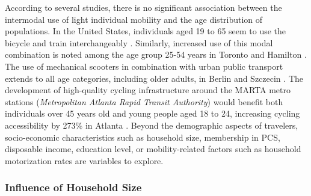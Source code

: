 \begin{refsegment}
According to several studies, there is no significant association between the intermodal use of light individual mobility and the age distribution of populations. In the United States, individuals aged 19 to 65 seem to use the bicycle and train interchangeably \textcolor{blue}{\autocite[108]{wang_bicycle-transit_2013}}. Similarly, increased use of this modal combination is noted among the age group 25-54 years in Toronto and Hamilton \textcolor{blue}{\autocite[2169]{chan_factors_2020}}. The use of mechanical scooters in combination with urban public transport extends to all age categories, including older adults, in Berlin and Szczecin \textcolor{blue}{\autocite[7]{kostrzewska_towards_2017}}. The development of high-quality cycling infrastructure around the MARTA metro stations (\textsl{Metropolitan Atlanta Rapid Transit Authority}) would benefit both individuals over 45 years old and young people aged 18 to 24, increasing cycling accessibility by 273\% in Atlanta \textcolor{blue}{\autocite[59]{bearn_adaption_2018}}. Beyond the demographic aspects of travelers, socio-economic characteristics such as household size, membership in \acrfull{PCS}, disposable income, education level, or mobility-related factors such as household motorization rates are variables to explore.%

\subsubsection*{Influence of Household Size
    \label{chap2:taille-menages}
    }


\end{refsegment}
